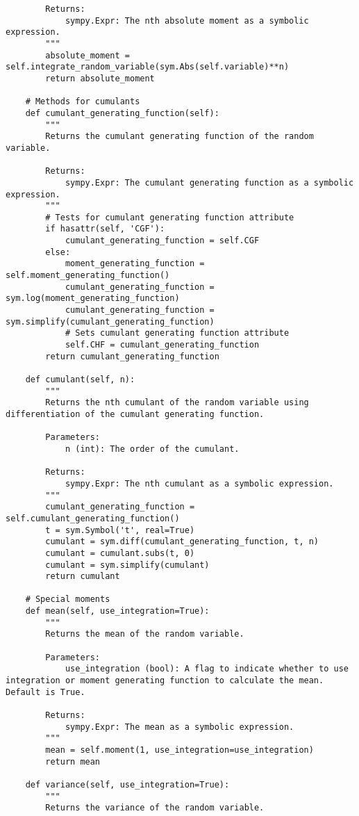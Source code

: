 \begin{small}
\begin{lstlisting}
        Returns:
            sympy.Expr: The nth absolute moment as a symbolic expression.
        """
        absolute_moment = self.integrate_random_variable(sym.Abs(self.variable)**n)
        return absolute_moment

    # Methods for cumulants
    def cumulant_generating_function(self):
        """
        Returns the cumulant generating function of the random variable.

        Returns:
            sympy.Expr: The cumulant generating function as a symbolic expression.
        """
        # Tests for cumulant generating function attribute
        if hasattr(self, 'CGF'):
            cumulant_generating_function = self.CGF
        else:
            moment_generating_function = self.moment_generating_function()
            cumulant_generating_function = sym.log(moment_generating_function)
            cumulant_generating_function = sym.simplify(cumulant_generating_function)
            # Sets cumulant generating function attribute
            self.CHF = cumulant_generating_function
        return cumulant_generating_function

    def cumulant(self, n):
        """
        Returns the nth cumulant of the random variable using differentiation of the cumulant generating function.

        Parameters:
            n (int): The order of the cumulant.

        Returns:
            sympy.Expr: The nth cumulant as a symbolic expression.
        """
        cumulant_generating_function = self.cumulant_generating_function()
        t = sym.Symbol('t', real=True)
        cumulant = sym.diff(cumulant_generating_function, t, n)
        cumulant = cumulant.subs(t, 0)
        cumulant = sym.simplify(cumulant)
        return cumulant

    # Special moments
    def mean(self, use_integration=True):
        """
        Returns the mean of the random variable.

        Parameters:
            use_integration (bool): A flag to indicate whether to use integration or moment generating function to calculate the mean. Default is True.

        Returns:
            sympy.Expr: The mean as a symbolic expression.
        """
        mean = self.moment(1, use_integration=use_integration)
        return mean

    def variance(self, use_integration=True):
        """
        Returns the variance of the random variable.


\end{lstlisting}
\end{small}
